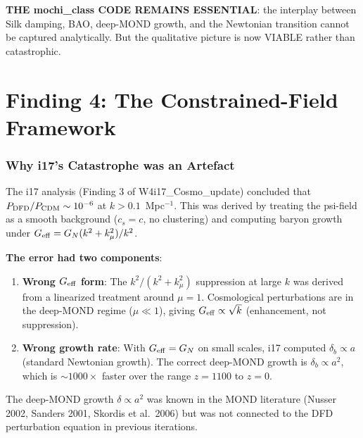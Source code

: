 \documentclass[11pt]{article}
\newcommand{\Geff}{G_{\rm eff}}
\newcommand{\kmu}{k_\mu}
\begin{document}
\textbf{THE mochi\_class CODE REMAINS ESSENTIAL}: the interplay between
Silk damping, BAO, deep-MOND growth, and the Newtonian transition
cannot be captured analytically. But the qualitative picture is now
VIABLE rather than catastrophic.


\part{Finding 4: The Constrained-Field Framework}
\label{part:constrained}

\section{Why i17's Catastrophe was an Artefact}

The i17 analysis (Finding 3 of W4i17\_Cosmo\_update) concluded that
$P_{\rm DFD}/P_{\rm CDM} \sim 10^{-6}$ at $k > 0.1$~Mpc$^{-1}$.
This was derived by treating the psi-field as a smooth background
($c_s = c$, no clustering) and computing baryon growth under
$\Geff = G_N(k^2+k_\mu^2)/k^2$.

\textbf{The error had two components}:

\begin{enumerate}
\item \textbf{Wrong $\Geff$ form}: The $k^2/(k^2+\kmu^2)$ suppression
  at large $k$ was derived from a linearized treatment around $\mu = 1$.
  Cosmological perturbations are in the deep-MOND regime ($\mu \ll 1$),
  giving $\Geff \propto \sqrt{k}$ (enhancement, not suppression).

\item \textbf{Wrong growth rate}: With $\Geff = G_N$ on small scales,
  i17 computed $\delta_b \propto a$ (standard Newtonian growth).
  The correct deep-MOND growth is $\delta_b \propto a^2$, which is
  $\sim 1000\times$ faster over the range $z = 1100$ to $z = 0$.
\end{enumerate}

The deep-MOND growth $\delta \propto a^2$ was known in the MOND
literature (Nusser 2002, Sanders 2001, Skordis et al.\ 2006) but
was not connected to the DFD perturbation equation in previous
iterations.
\end{document}
